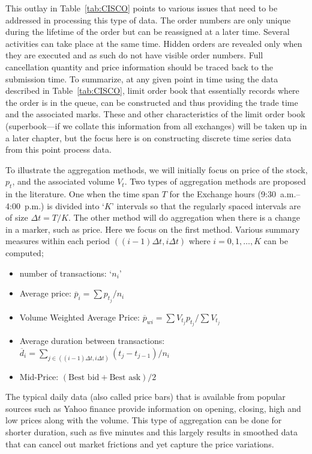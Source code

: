 This outlay in Table~\ref{tab:CISCO} points to various issues that need to be addressed in processing this type of data. The order numbers are only unique during the lifetime of the order but can be reassigned at a later time. Several activities can take place at the same time. Hidden orders are revealed only when they are executed and as such do not have visible order numbers. Full cancellation quantity and price information should be traced back to the submission time. To summarize, at any given point in time using the data described in Table~\ref{tab:CISCO}, limit order book that essentially records where the order is in the queue, can be constructed and thus providing the trade time and the associated marks. These and other characteristics of the limit order book (superbook---if we collate this information from all exchanges) will be taken up in a later chapter, but the focus here is on constructing discrete time series data from this point process data. 


To illustrate the aggregation methods, we will initially focus on price of the stock, $p_t$, and the associated volume $V_{t}$. Two types of aggregation methods are proposed in the literature. One when the time span $T$ for the Exchange hours (9:30~a.m.--4:00~p.m.) is divided into `$K$' intervals so that the regularly spaced intervals are of size $\Delta t = T/K$. The other method will do aggregation when there is a change in a marker, such as price. Here we focus on the first method. Various summary measures within each period $((i - 1)\Delta t, i\Delta t)$ where $i = 0,1,\ldots,K$ can be computed;
\begin{itemize}
\item number of transactions: `$n_i$'
\item Average price: $\overline{p}_i = \sum p_{t_j}/n_i$
\item Volume Weighted Average Price: $\overline{p}_{wi} = \sum V_{t_j}p_{t_j}/\sum V_{t_j}$
\item Average duration between transactions: $\overline{d}_i = \sum_{j\in ((i-1)\Delta t,i\Delta t) }(t_j - t_{j-1})/n_i$
\item Mid-Price: $(\text{Best bid}+\text{Best ask})/2$
\end{itemize}


The typical daily data (also called price bars) that is available from popular sources such as Yahoo finance provide information on opening, closing, high and low prices along with the volume. This type of aggregation can be done for shorter duration, such as five minutes and this largely results in smoothed data that can cancel out market frictions and yet capture the price variations. 


